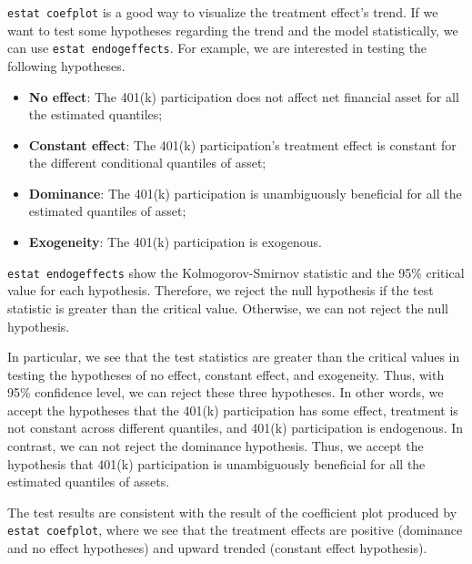 {\tt estat coefplot} is a good way to visualize the treatment effect's trend. If
we want to test some hypotheses regarding the trend and the model statistically,
we can use {\tt estat endogeffects}. For example, we are interested in testing
the following hypotheses.

\begin{itemize} 

\item {\bf No effect}: The 401(k) participation does not affect net financial
asset for all the estimated quantiles; 

\item {\bf Constant effect}: The 401(k) participation's treatment effect is
constant for the different conditional quantiles of asset; 

\item {\bf Dominance}: The 401(k) participation is unambiguously beneficial for
all the estimated quantiles of asset; 

\item {\bf Exogeneity}: The 401(k) participation is exogenous.
\end{itemize}

\clearpage

\begin{stlog}

\end{stlog}

{\tt estat endogeffects} show the Kolmogorov-Smirnov statistic and the 95\%
critical value for each hypothesis. Therefore, we reject the null hypothesis if
the test statistic is greater than the critical value. Otherwise, we can not
reject the null hypothesis.

In particular, we see that the test statistics are greater than the critical
values in testing the hypotheses of no effect, constant effect, and exogeneity.
Thus, with 95\% confidence level, we can reject these three hypotheses. In other
words, we accept the hypotheses that the 401(k) participation has some effect,
treatment is not constant across different quantiles, and 401(k) participation
is endogenous.  In contrast, we can not reject the dominance hypothesis. Thus,
we accept the hypothesis that 401(k) participation is unambiguously beneficial
for all the estimated quantiles of assets.

The test results are consistent with the result of the coefficient plot
produced by {\tt estat coefplot}, where we see that the treatment effects are
positive (dominance and no effect hypotheses) and upward trended (constant
effect hypothesis).

